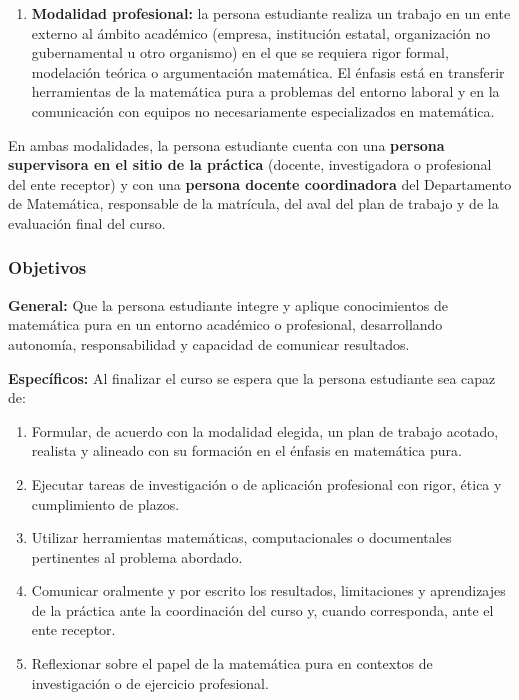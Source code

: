 \begin{refsection}
\begin{enumerate}
\item \textbf{Modalidad profesional:} la persona estudiante realiza un trabajo en un ente externo al ámbito académico (empresa, institución estatal, organización no gubernamental u otro organismo) en el que se requiera rigor formal, modelación teórica o argumentación matemática. El énfasis está en transferir herramientas de la matemática pura a problemas del entorno laboral y en la comunicación con equipos no necesariamente especializados en matemática.
\end{enumerate}

En ambas modalidades, la persona estudiante cuenta con una \textbf{persona supervisora en el sitio de la práctica} (docente, investigadora o profesional del ente receptor) y con una \textbf{persona docente coordinadora} del Departamento de Matemática, responsable de la matrícula, del aval del plan de trabajo y de la evaluación final del curso.

\subsubsection*{Objetivos}

\textbf{General:} Que la persona estudiante integre y aplique conocimientos de matemática pura en un entorno académico o profesional, desarrollando autonomía, responsabilidad y capacidad de comunicar resultados.

\textbf{Específicos:} Al finalizar el curso se espera que la persona estudiante sea capaz de:

\begin{enumerate}
\item Formular, de acuerdo con la modalidad elegida, un plan de trabajo acotado, realista y alineado con su formación en el énfasis en matemática pura.
\item Ejecutar tareas de investigación o de aplicación profesional con rigor, ética y cumplimiento de plazos.
\item Utilizar herramientas matemáticas, computacionales o documentales pertinentes al problema abordado.
\item Comunicar oralmente y por escrito los resultados, limitaciones y aprendizajes de la práctica ante la coordinación del curso y, cuando corresponda, ante el ente receptor.
\item Reflexionar sobre el papel de la matemática pura en contextos de investigación o de ejercicio profesional.
\end{enumerate}


\end{refsection}
